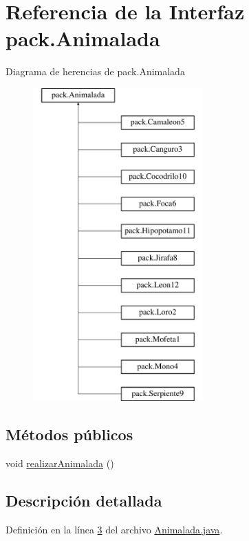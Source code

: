 \hypertarget{interfacepack_1_1_animalada}{}\section{Referencia de la Interfaz pack.\+Animalada}
\label{interfacepack_1_1_animalada}
Diagrama de herencias de pack.\+Animalada\begin{figure}[H]
\begin{center}
\leavevmode
\includegraphics[height=12.000000cm]{interfacepack_1_1_animalada}
\end{center}
\end{figure}
\subsection*{Métodos públicos}
\begin{DoxyCompactItemize}
\item 
void \mbox{\hyperlink{interfacepack_1_1_animalada_a5ba346bdbccde39f3ea438ae8cbf8c1b}{realizar\+Animalada}} ()
\end{DoxyCompactItemize}


\subsection{Descripción detallada}


Definición en la línea \mbox{\hyperlink{_animalada_8java_source_l00003}{3}} del archivo \mbox{\hyperlink{_animalada_8java_source}{Animalada.\+java}}.



